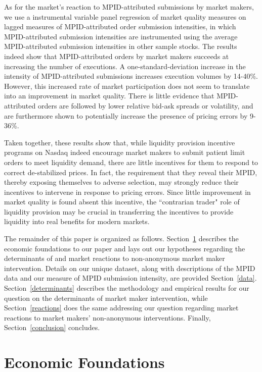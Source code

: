 \documentclass{article}
\begin{document}
As for the market's reaction to MPID-attributed submissions by market makers, we use a instrumental variable panel regression of market quality measures on lagged measures of MPID-attributed order submission intensities, in which MPID-attributed submission intensities are instrumented using the average MPID-attributed submission intensities in other sample stocks. The results indeed show that MPID-attributed orders by market makers succeeds at increasing the number of executions. A one-standard-deviation increase in the intensity of MPID-attributed submissions increases execution volumes by 14-40\%. However, this increased rate of market participation does not seem to translate into an improvement in market quality. There is little evidence that MPID-attributed orders are followed by lower relative bid-ask spreads or volatility, and are furthermore shown to potentially increase the presence of pricing errors by 9-36\%.

Taken together, these results show that, while liquidity provision incentive programs on Nasdaq indeed encourage market makers to submit patient limit orders to meet liquidity demand, there are little incentives for them to respond to correct de-stabilized prices. In fact, the requirement that they reveal their MPID, thereby exposing themselves to adverse selection, may strongly reduce their incentives to intervene in response to pricing errors. Since little improvement in market quality is found absent this incentive, the ``contrarian trader" role of liquidity provision may be crucial in transferring the incentives to provide liquidity into real benefits for modern markets.

\noindent The remainder of this paper is organized as follows. Section~\ref{hypothesis} describes the economic foundations to our paper and lays out our hypotheses regarding the determinants of and market reactions to non-anonymous market maker intervention. Details on our unique dataset, along with descriptions of the MPID data and our measure of MPID submission intensity, are provided Section~\ref{data}. Section~\ref{determinants} describes the methodology and empirical results for our question on the determinants of market maker intervention, while Section~\ref{reactions} does the same addressing our question regarding market reactions to market makers' non-anonymous interventions. Finally, Section~\ref{conclusion} concludes.

\section{Economic Foundations}\label{hypothesis}
\end{document}
